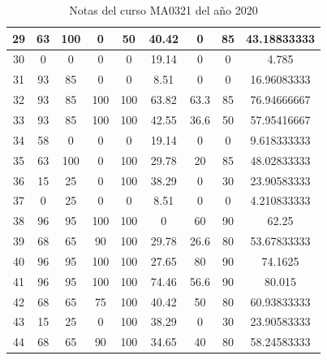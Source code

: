 \begin{table}[H]
\begin{tabular}{|c|c|c|c|c|c|c|c|c|}
29          & 63          & 100         & 0           & 50           & 40.42       & 0           & 85            & 43.18833333         \\ \hline
30          & 0           & 0           & 0           & 0            & 19.14       & 0           & 0             & 4.785               \\ \hline
31          & 93          & 85          & 0           & 0            & 8.51        & 0           & 0             & 16.96083333         \\ \hline
32          & 93          & 85          & 100         & 100          & 63.82       & 63.3        & 85            & 76.94666667         \\ \hline
33          & 93          & 85          & 100         & 100          & 42.55       & 36.6        & 50            & 57.95416667         \\ \hline
34          & 58          & 0           & 0           & 0            & 19.14       & 0           & 0             & 9.618333333         \\ \hline
35          & 63          & 100         & 0           & 100          & 29.78       & 20          & 85            & 48.02833333         \\ \hline
36          & 15          & 25          & 0           & 100          & 38.29       & 0           & 30            & 23.90583333         \\ \hline
37          & 0           & 25          & 0           & 0            & 8.51        & 0           & 0             & 4.210833333         \\ \hline
38          & 96          & 95          & 100         & 100          & 0           & 60          & 90            & 62.25               \\ \hline
39          & 68          & 65          & 90          & 100          & 29.78       & 26.6        & 80            & 53.67833333         \\ \hline
40          & 96          & 95          & 100         & 100          & 27.65       & 80          & 90            & 74.1625             \\ \hline
41          & 96          & 95          & 100         & 100          & 74.46       & 56.6        & 90            & 80.015              \\ \hline
42          & 68          & 65          & 75          & 100          & 40.42       & 50          & 80            & 60.93833333         \\ \hline
43          & 15          & 25          & 0           & 100          & 38.29       & 0           & 30            & 23.90583333         \\ \hline
44          & 68          & 65          & 90          & 100          & 34.65       & 40          & 80            & 58.24583333         \\ \hline
\end{tabular}
    \caption{Notas del curso MA0321 del año 2020}
    \label{tab:notas}
\end{table}


